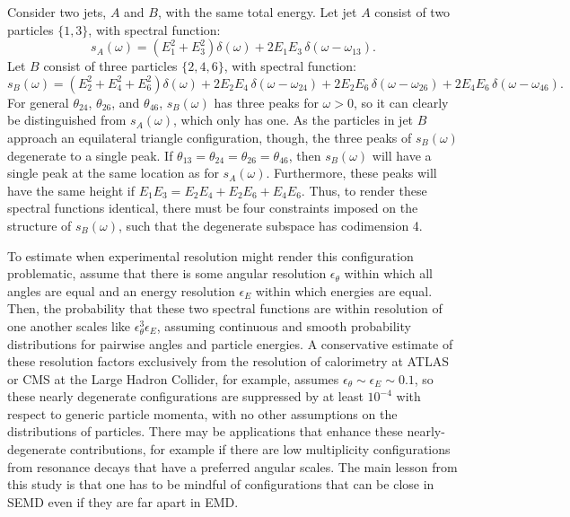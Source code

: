 \documentclass[letterpaper,11pt]{article}
\begin{document}
Consider two jets, $A$ and $B$, with the same total energy.
%
Let jet $A$ consist of two particles $\{1,3\}$, with spectral function:
%
\begin{equation}
s_A(\omega)=(E_1^2+E_3^2 )\delta(\omega)
+ 2E_1E_3\,\delta( \omega-\omega_{13} ).
\end{equation}
%
Let $B$ consist of three particles $\{2,4,6\}$, with spectral function:
%
\begin{equation}
s_B(\omega) =(E_2^2+E_4^2+E_6^2 )\delta(\omega)
+ 2E_2 E_4\,\delta(\omega - \omega_{24})
+ 2E_2 E_6\,\delta(\omega - \omega_{26} )
+ 2E_4 E_6\,\delta(\omega - \omega_{46} ).
\end{equation}
%
For general $\theta_{24}$, $\theta_{26}$, and $\theta_{46}$, $s_B(\omega)$ has three peaks for $\omega>0$, so it can clearly be distinguished from $s_A(\omega)$, which only has one.
%
As the particles in jet $B$ approach an equilateral triangle configuration, though, the three peaks of $s_B(\omega)$ degenerate to a single peak.
%
If $\theta_{13} = \theta_{24}=\theta_{26}=\theta_{46}$, then $s_B(\omega)$ will have a single peak at the same location as for $s_A(\omega)$.
%
Furthermore, these peaks will have the same height if $E_1 E_3 =E_2 E_4+ E_2 E_6 + E_4 E_6$.
%
Thus, to render these spectral functions identical, there must be four constraints imposed on the structure of $s_B(\omega)$, such that the degenerate subspace has codimension 4.


To estimate when experimental resolution might render this configuration problematic, assume that there is some angular resolution $\epsilon_\theta$ within which all angles are equal and an energy resolution $\epsilon_E$ within which energies are equal.
%
Then, the probability that these two spectral functions are within resolution of one another scales like $\epsilon_\theta^3 \epsilon_E$, assuming continuous and smooth probability distributions for pairwise angles and particle energies.
%
A conservative estimate of these resolution factors exclusively from the resolution of calorimetry at ATLAS or CMS at the Large Hadron Collider, for example, assumes $\epsilon_\theta\sim \epsilon_E\sim 0.1$, so these nearly degenerate configurations are suppressed by at least $10^{-4}$ with respect to generic particle momenta, with no other assumptions on the distributions of particles.
%
There may be applications that enhance these nearly-degenerate contributions, for example if there are low multiplicity configurations from resonance decays that have a preferred angular scales.
%
The main lesson from this study is that one has to be mindful of configurations that can be close in SEMD even if they are far apart in EMD.
\end{document}
